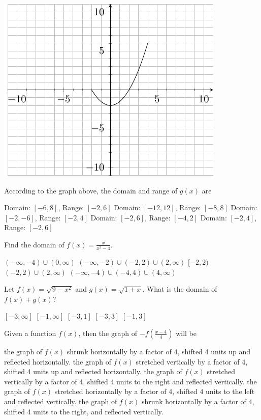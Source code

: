 \documentclass[11pt]{article}
\begin{document}
\begin{questions}
\begin{multiplechoice}{5}
\begin{minipage}{\linewidth}%
\centering
\makebox[\linewidth]{}
\includegraphics{exam1graph2.pdf}
\label{graph2exam1}%
\end{minipage}
According to the graph above, the domain and range of $g(x)$ are
\begin{answers}{2}
\ans Domain: $[-6,8]$, Range: $[-2,6]$
\ans Domain: $[-12,12]$, Range: $[-8,8]$
\ans Domain: $[-2,-6]$, Range: $[-2,4]$
\ans Domain: $[-2,6]$, Range: $[-4,2]$
\ans Domain: $[-2,4]$, Range: $[-2,6]$
\end{answers}

\question Find the domain of $f(x) = \frac{x}{x^2-4}$.
\begin{answers}{2}
\ans  $(-\infty, -4) \cup (0, \infty)$
\ans  $(-\infty, -2) \cup (-2,2) \cup (2, \infty)$
\ans $[-2,2)$
\ans $(-2,2) \cup (2, \infty)$
\ans $(-\infty, -4) \cup (-4,4) \cup (4, \infty) $
\end{answers}


\question Let $f(x) = \sqrt{9-x^2}$ and $g(x)=\sqrt{1+x}$.  What is the domain of $f(x)+g(x)$?
\begin{answers}{2}
\ans $[-3,\infty]$
\ans $[-1,\infty]$
\ans $[-3,1]$
\ans $[-3,3]$
\ans $[-1,3]$
\end{answers}

\nextpage

\question Given a function $f(x)$, then the graph of $-f\left(\frac{x-4}{4}\right)$ will be
\begin{answers}{2}
\ans the graph of $f(x)$ shrunk horizontally by a factor of 4, shifted 4 units up and reflected horizontally.
\ans the graph of $f(x)$ stretched vertically by a factor of 4, shifted 4 units up and reflected horizontally.
\ans the graph of $f(x)$ stretched vertically by a factor of 4, shifted 4 units to the right and reflected vertically.
\ans the graph of $f(x)$ stretched horizontally by a factor of 4, shifted 4 units to the left and reflected vertically. %
\ans the graph of $f(x)$ shrunk horizontally by a factor of 4, shifted 4 units to the right, and reflected vertically.
\end{answers}



\end{multiplechoice}
\end{questions}
\end{document}
